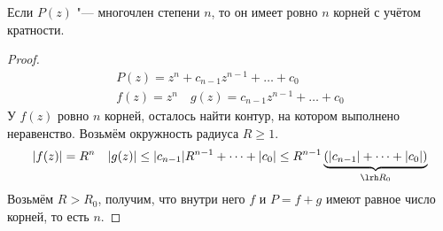 \begin{conseq}
	Если $P(z)$ "--- многочлен степени $n$, то он имеет ровно $n$ корней с учётом кратности.
\end{conseq}
\begin{proof}
	\begin{gather*}
		P(z) = z^n + c_{n-1}z^{n-1} + \dots + c_0 \\
		f(z) = z^n \quad g(z) = c_{n-1}z^{n-1} + \dots + c_0
	\end{gather*}
	У $f(z)$ ровно $n$ корней, осталось найти контур, на котором выполнено неравенство.
	Возьмём окружность радиуса $R \ge 1$.
	\begin{gather*}
		|f(z)| = R^n \quad
		|g(z)| \le |c_{n-1}| R^{n-1} + \dots + |c_0| \le R^{n-1} \underbrace{(|c_{n-1}| + \dots + |c_0|)}_{\lrh R_0}
	\end{gather*}
	Возьмём $R > R_0$, получим, что внутри него $f$ и $P = f+g$ имеют равное число корней, то есть $n$.
\end{proof}

